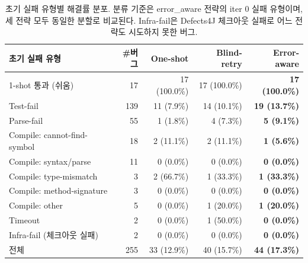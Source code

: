 \begin{table}[t]
\caption{초기 실패 유형별 해결률 분포. 분류 기준은 error_aware 전략의 iter 0 실패 유형이며, 세 전략 모두 동일한 분할로 비교된다. Infra-fail은 Defects4J 체크아웃 실패로 어느 전략도 시도하지 못한 버그.}
\label{tab:breakdown}
\centering
\small
\begin{tabular}{lrrrr}
\toprule
초기 실패 유형 & \#버그 & One-shot & Blind-retry & \textbf{Error-aware} \\
\midrule
1-shot 통과 (쉬움) & 17 & 17 (100.0\%) & 17 (100.0\%) & \textbf{17 (100.0\%)} \\
Test-fail & 139 & 11 (7.9\%) & 14 (10.1\%) & \textbf{19 (13.7\%)} \\
Parse-fail & 55 & 1 (1.8\%) & 4 (7.3\%) & \textbf{5 (9.1\%)} \\
Compile: cannot-find-symbol & 18 & 2 (11.1\%) & 2 (11.1\%) & \textbf{1 (5.6\%)} \\
Compile: syntax/parse & 11 & 0 (0.0\%) & 0 (0.0\%) & \textbf{0 (0.0\%)} \\
Compile: type-mismatch & 3 & 2 (66.7\%) & 1 (33.3\%) & \textbf{1 (33.3\%)} \\
Compile: method-signature & 3 & 0 (0.0\%) & 0 (0.0\%) & \textbf{0 (0.0\%)} \\
Compile: other & 5 & 0 (0.0\%) & 1 (20.0\%) & \textbf{1 (20.0\%)} \\
Timeout & 2 & 0 (0.0\%) & 1 (50.0\%) & \textbf{0 (0.0\%)} \\
Infra-fail (체크아웃 실패) & 2 & 0 (0.0\%) & 0 (0.0\%) & \textbf{0 (0.0\%)} \\
\midrule
전체 & 255 & 33 (12.9\%) & 40 (15.7\%) & \textbf{44 (17.3\%)} \\
\bottomrule
\end{tabular}
\end{table}